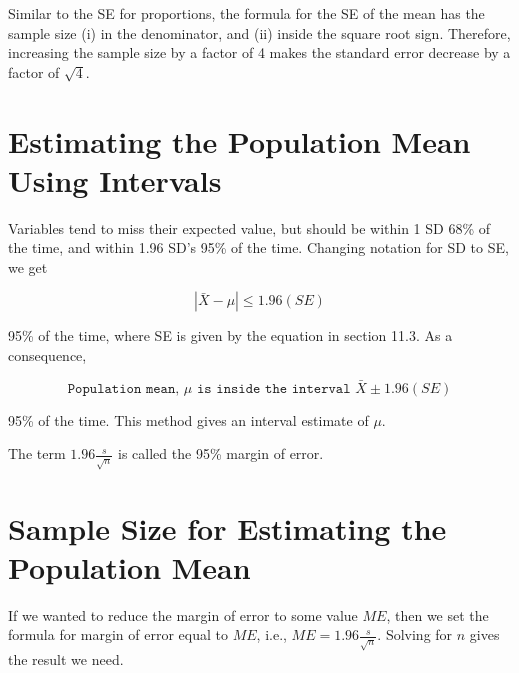 \documentclass[11pt]{book}\usepackage[]{graphicx}\usepackage[]{color}
\begin{document}
Similar to the SE for proportions, the formula for the SE of the mean has the sample size (i) in the denominator, and (ii) inside the square root sign.  Therefore, increasing the sample size by a factor of 4 makes the standard error decrease by a factor of $\sqrt{4}$. 


\section{Estimating the Population Mean Using Intervals}

Variables tend to miss their expected value, but should be within 1 SD 68\% of the time, and within 1.96 SD's 95\% of the time. Changing notation for SD to SE, we get

\begin{equation*}
| \bar{X} - \mu | \le 1.96 (SE) 
\end{equation*}

95\% of the time, where SE is given by the equation in section 11.3.  As a consequence,

\begin{equation*}
\texttt{Population mean, } \mu \texttt{ is inside the interval } \bar{X} \pm 1.96 (SE) 
\end{equation*}

95\% of the time.  This method gives an interval estimate of $\mu$. 

\vspace{2mm}


\vspace{2mm}

The term $1.96 \frac{s}{\sqrt{n}}$ is called the 95\% margin of error.

\section{Sample Size for Estimating the Population Mean}

If we wanted to reduce the margin of error to some value $ME$, then we set the formula for margin of error equal to $ME$, i.e., $ME = 1.96 \frac{s}{\sqrt{n}}$.  Solving for $n$ gives the result we need.  
\end{document}

